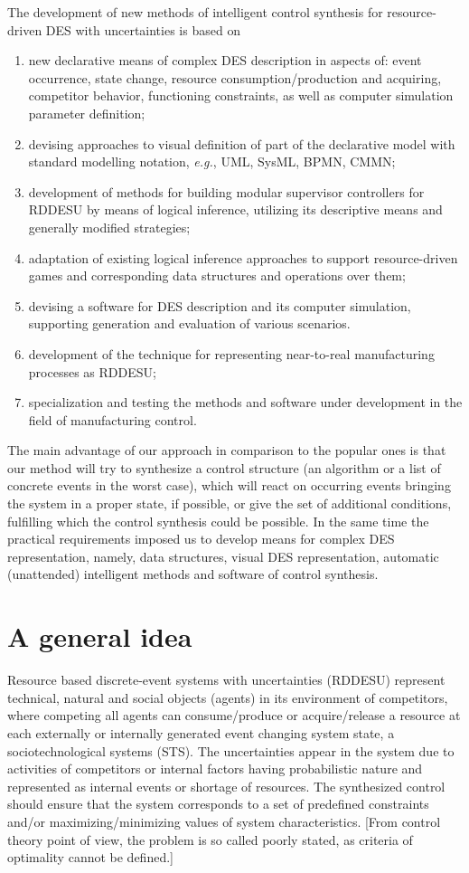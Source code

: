 \documentclass[runningheads]{llncs}
\begin{document}
The development of new methods of intelligent control synthesis for resource-driven DES with uncertainties is based on
\begin{enumerate}
\item new declarative means of complex DES description in aspects of: event occurrence, state change, resource consumption/production and acquiring, competitor behavior, functioning constraints, as well as computer simulation parameter definition;
\item devising approaches to visual definition of part of the declarative model with standard modelling notation, \emph{e.g.}, UML, SysML, BPMN, CMMN;
\item development of methods for building modular supervisor controllers for RDDESU by means of logical inference, utilizing its descriptive means and generally modified strategies;
\item adaptation of existing logical inference approaches to support resource-driven games and corresponding data structures and operations over them;
\item devising a software for DES description and its computer simulation, supporting generation and evaluation of various scenarios.
\item development of the technique for representing near-to-real manufacturing processes as RDDESU;
\item specialization and testing the methods and software under development in the field of manufacturing control.
\end{enumerate}

The main advantage of our approach in comparison to the popular ones is that our method will try to synthesize a control structure (an algorithm or a list of concrete events in the worst case), which will react on occurring events bringing the system in a proper state, if possible, or give the set of additional conditions, fulfilling which the control synthesis could be possible. In the same time the practical requirements imposed us to develop means for complex DES representation, namely, data structures, visual DES representation, automatic (unattended) intelligent methods and software of control synthesis.

\section{A general idea}
\label{sec:idea}

Resource based discrete-event systems with uncertainties (RDDESU) represent technical, natural and social objects (agents) in its environment of competitors, where competing all agents can consume/produce or acquire/release a resource at each externally or internally generated event changing system state, a sociotechnological systems (STS). The uncertainties appear in the system due to activities of competitors or internal factors having probabilistic nature and represented as internal events or shortage of resources. The synthesized control should ensure that the system corresponds to a set of predefined constraints and/or maximizing/minimizing values of system characteristics. [From control theory point of view, the problem is so called poorly stated, as criteria of optimality cannot be defined.]
\end{document}
